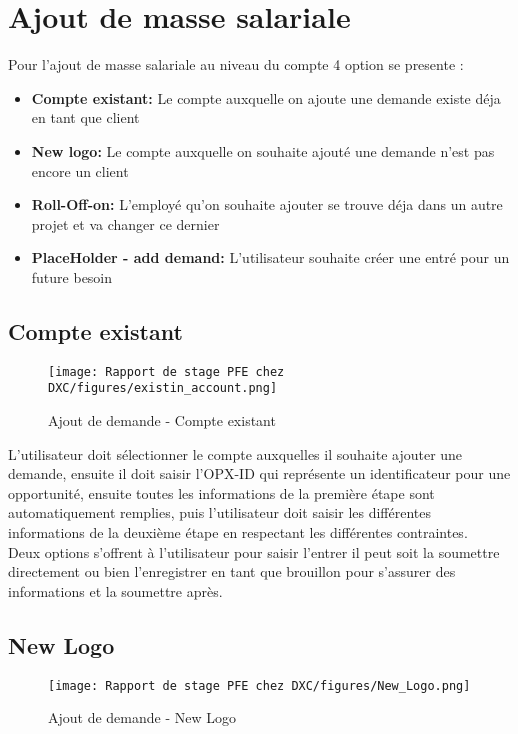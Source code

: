 \newpage
\section{Ajout de masse salariale}
Pour l'ajout de masse salariale au niveau du compte 4 option se presente :

\begin{itemize}
    \item \textbf{Compte existant:} Le compte auxquelle on ajoute une demande existe déja en tant que client
    \item \textbf{New logo:}  Le compte auxquelle on souhaite ajouté une demande n'est pas encore un client
    \item \textbf{Roll-Off\Roll-on:} L'employé qu'on souhaite ajouter se trouve déja dans un autre projet et va changer ce dernier
    \item \textbf{PlaceHolder - add demand:} L'utilisateur souhaite créer une entré pour un future besoin
\end{itemize}

\subsection{Compte existant}

\begin{figure}[!h]
    \centering
    \texttt{[image: Rapport de stage PFE chez DXC/figures/existin\_account.png]}
    \caption{Ajout de demande - Compte existant}
\end{figure}

L'utilisateur doit sélectionner le compte auxquelles il souhaite ajouter une demande, ensuite il doit saisir l'OPX-ID qui représente un identificateur pour une opportunité, ensuite toutes les informations de la première étape sont automatiquement remplies, puis l'utilisateur doit saisir les différentes informations de la deuxième étape en respectant les différentes contraintes. 
\\[0.3cm]
Deux options s’offrent à l'utilisateur pour saisir l’entrer il peut soit la soumettre directement ou bien l'enregistrer en tant que brouillon pour s'assurer des informations et la soumettre après.

\newpage
\subsection{New Logo}

\begin{figure}[!h]
    \centering
    \texttt{[image: Rapport de stage PFE chez DXC/figures/New\_Logo.png]}
    \caption{Ajout de demande - New Logo}
\end{figure}

